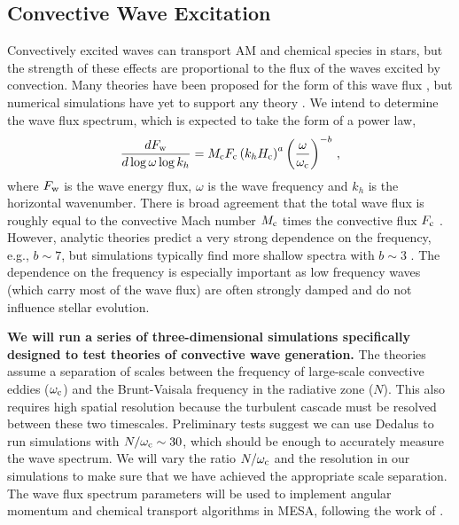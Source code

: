 \subsection{Convective Wave Excitation}
\label{convex}

Convectively excited waves can transport AM and chemical species in stars, but the strength of these effects are proportional to the flux of the waves excited by convection. Many theories have been proposed for the form of this wave flux \citep{Press_1981,Goldreich_1990,Belkacem_2008,Lecoanet_2013}, but numerical simulations have yet to support any theory \citep{Rogers_2006,Rogers_2013,Alvan_2014,Lecoanet_2015}. We intend to determine the wave flux spectrum, which is expected to take the form of a power law,
\begin{equation}
\frac{d F_{\rm w}}{d\log \omega \log k_h} = M_{\rm c}F_{\rm c} \left(k_h H_{\rm c}\right)^{a} \left(\frac{\omega}{\omega_{\rm c}}\right)^{-b} \, ,
\end{equation}
where $F_{\rm w}$ is the wave energy flux, $\omega$ is the wave frequency and $k_h$ is the horizontal wavenumber. There is broad agreement that the total wave flux is roughly equal to the convective Mach number $M_{\rm c}$ times the convective flux $F_{\rm c}$ \citep[e.g.,][]{Rogers_2013,Lecoanet_2015}. However, analytic theories predict a very strong dependence on the frequency, e.g., $b\sim 7$, but simulations typically find more shallow spectra with $b\sim 3$ \citep{Rogers_2013}. The dependence on the frequency is especially important as low frequency waves (which carry most of the wave flux) are often strongly damped and do not influence stellar evolution. 

{\bf We will run a series of three-dimensional simulations specifically designed to test theories of convective wave generation.} The theories assume a separation of scales between the frequency of large-scale convective eddies ($\omega_{\rm c}$) and the Brunt-Vaisala frequency in the radiative zone ($N$). This also requires high spatial resolution because the turbulent cascade must be resolved between these two timescales. Preliminary tests suggest we can use Dedalus to run simulations with $N/\omega_{\rm c}\sim 30$, which should be enough to accurately measure the wave spectrum. We will vary the ratio $N/\omega_{\rm c}$ and the resolution in our simulations to make sure that we have achieved the appropriate scale separation. The wave flux spectrum parameters will be used to implement angular momentum and chemical transport algorithms in MESA, following the work of \citet{fullerwave:14,fullerwave:15}.  %


